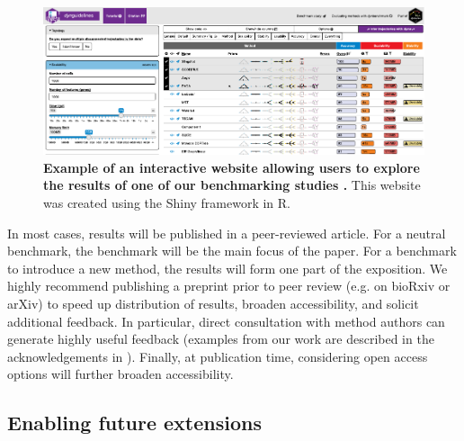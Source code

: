 \begin{figure}[htb!]
	\centering
	\includegraphics[width=\hugefigure]{fig/essential_guidelines_figure3} 
	\caption{\textbf{Example of an interactive website allowing users to explore the results of one of our benchmarking studies \cite{saelens_comparisonsinglecelltrajectory_2019}.} This website was created using the Shiny framework in R.}
	\label{fig:fig3_interactive}
\end{figure}

In most cases, results will be published in a peer-reviewed article. For a neutral benchmark, the benchmark will be the main focus of the paper. For a benchmark to introduce a new method, the results will form one part of the exposition. We highly recommend publishing a preprint prior to peer review (e.g. on bioRxiv or arXiv) to speed up distribution of results, broaden accessibility, and solicit additional feedback. In particular, direct consultation with method authors can generate highly useful feedback (examples from our work are described in the acknowledgements in \cite{lindgreen_evaluationaccuracyspeed_2016,freyhult_exploringgenomicdark_2007}). Finally, at publication time, considering open access options will further broaden accessibility.

\subsection{Enabling future extensions}

